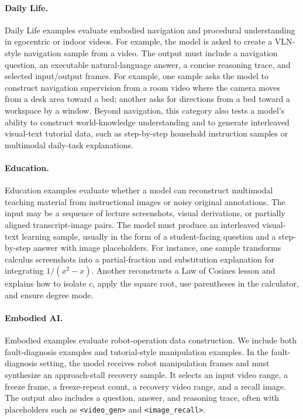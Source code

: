 \documentclass{llmxive}
\begin{document}
\paragraph{Daily Life.}
Daily Life examples evaluate embodied navigation and procedural understanding in egocentric or indoor videos. For example, the model is asked to create a VLN-style navigation sample from a video. The output must include a navigation question, an executable natural-language answer, a concise reasoning trace, and selected input/output frames. For example, one sample asks the model to construct navigation supervision from a room video where the camera moves from a desk area toward a bed; another asks for directions from a bed toward a workspace by a window. 
Beyond navigation, this category also tests a model's ability to construct world-knowledge understanding and to generate interleaved visual-text tutorial data, such as step-by-step household instruction samples or multimodal daily-task explanations.

\paragraph{Education.}
Education examples evaluate whether a model can reconstruct multimodal teaching material from instructional images or noisy original annotations. The input may be a sequence of lecture screenshots, visual derivations, or partially aligned transcript-image pairs. The model must produce an interleaved visual-text learning sample, usually in the form of a student-facing question and a step-by-step answer with image placeholders. For instance, one sample transforms calculus screenshots into a partial-fraction and substitution explanation for integrating \(1/(x^2-x)\). Another reconstructs a Law of Cosines lesson and explains how to isolate \(c\), apply the square root, use parentheses in the calculator, and ensure degree mode. 

\paragraph{Embodied AI.}
Embodied examples evaluate robot-operation data construction. We include both fault-diagnosis examples and tutorial-style manipulation examples. In the fault-diagnosis setting, the model receives robot manipulation frames and must synthesize an approach-stall recovery sample. It selects an input video range, a freeze frame, a freeze-repeat count, a recovery video range, and a recall image. The output also includes a question, answer, and reasoning trace, often with placeholders such as \texttt{<video\_gen>} and \texttt{<image\_recall>}. 
\end{document}
